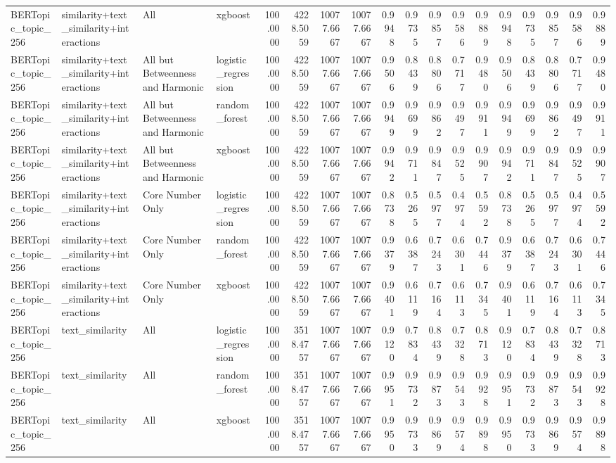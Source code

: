 \begin{tabular}{llllrrrrrrrrrrrrrr}
BERTopic_topic_256 & similarity+text_similarity+interactions & All & xgboost & 100.0000 & 4228.5059 & 10077.6667 & 10077.6667 & 0.9948 & 0.9735 & 0.9857 & 0.9586 & 0.9889 & 0.9948 & 0.9735 & 0.9857 & 0.9586 & 0.9889 \\
BERTopic_topic_256 & similarity+text_similarity+interactions & All but Betweenness and Harmonic & logistic_regression & 100.0000 & 4228.5059 & 10077.6667 & 10077.6667 & 0.9506 & 0.8439 & 0.8806 & 0.7717 & 0.9480 & 0.9506 & 0.8439 & 0.8806 & 0.7717 & 0.9480 \\
BERTopic_topic_256 & similarity+text_similarity+interactions & All but Betweenness and Harmonic & random_forest & 100.0000 & 4228.5059 & 10077.6667 & 10077.6667 & 0.9949 & 0.9699 & 0.9862 & 0.9497 & 0.9911 & 0.9949 & 0.9699 & 0.9862 & 0.9497 & 0.9911 \\
BERTopic_topic_256 & similarity+text_similarity+interactions & All but Betweenness and Harmonic & xgboost & 100.0000 & 4228.5059 & 10077.6667 & 10077.6667 & 0.9942 & 0.9711 & 0.9847 & 0.9525 & 0.9907 & 0.9942 & 0.9711 & 0.9847 & 0.9525 & 0.9907 \\
BERTopic_topic_256 & similarity+text_similarity+interactions & Core Number Only & logistic_regression & 100.0000 & 4228.5059 & 10077.6667 & 10077.6667 & 0.8738 & 0.5265 & 0.5977 & 0.4974 & 0.5592 & 0.8738 & 0.5265 & 0.5977 & 0.4974 & 0.5592 \\
BERTopic_topic_256 & similarity+text_similarity+interactions & Core Number Only & random_forest & 100.0000 & 4228.5059 & 10077.6667 & 10077.6667 & 0.9379 & 0.6387 & 0.7243 & 0.6301 & 0.7446 & 0.9379 & 0.6387 & 0.7243 & 0.6301 & 0.7446 \\
BERTopic_topic_256 & similarity+text_similarity+interactions & Core Number Only & xgboost & 100.0000 & 4228.5059 & 10077.6667 & 10077.6667 & 0.9401 & 0.6119 & 0.7164 & 0.6113 & 0.7345 & 0.9401 & 0.6119 & 0.7164 & 0.6113 & 0.7345 \\
BERTopic_topic_256 & text_similarity & All & logistic_regression & 100.0000 & 3518.4757 & 10077.6667 & 10077.6667 & 0.9120 & 0.7834 & 0.8439 & 0.7328 & 0.8713 & 0.9120 & 0.7834 & 0.8439 & 0.7328 & 0.8713 \\
BERTopic_topic_256 & text_similarity & All & random_forest & 100.0000 & 3518.4757 & 10077.6667 & 10077.6667 & 0.9951 & 0.9732 & 0.9873 & 0.9543 & 0.9928 & 0.9951 & 0.9732 & 0.9873 & 0.9543 & 0.9928 \\
BERTopic_topic_256 & text_similarity & All & xgboost & 100.0000 & 3518.4757 & 10077.6667 & 10077.6667 & 0.9950 & 0.9733 & 0.9869 & 0.9574 & 0.9898 & 0.9950 & 0.9733 & 0.9869 & 0.9574 & 0.9898 \\

\end{tabular}
